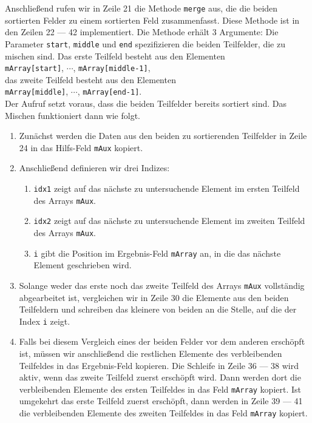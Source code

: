Anschlie{\ss}end rufen wir in Zeile 21 die Methode \texttt{merge} aus, die die beiden
sortierten Felder zu einem sortierten Feld zusammenfasst.  Diese Methode ist in den Zeilen
22 --- 42 implementiert.  Die Methode erh\"alt 3 Argumente: Die Parameter \texttt{start},
\texttt{middle} und \texttt{end} spezifizieren die beiden Teilfelder, die zu mischen sind.
Das erste Teilfeld besteht aus den Elementen \\[0.2cm]
\hspace*{1.3cm} \texttt{mArray[start]}, $\cdots$, \texttt{mArray[middle-1]}, \\[0.2cm]
das zweite Teilfeld besteht aus den Elementen \\[0.2cm]
\hspace*{1.3cm} \texttt{mArray[middle]}, $\cdots$, \texttt{mArray[end-1]}. \\[0.2cm]
Der Aufruf setzt voraus, dass die beiden Teilfelder bereits sortiert sind.
Das Mischen funktioniert dann wie folgt.
\begin{enumerate}
\item Zun\"achst werden die Daten aus den beiden zu sortierenden Teilfelder
      in Zeile 24 in das Hilfs-Feld \texttt{mAux} kopiert.
\item Anschlie{\ss}end definieren wir drei Indizes:
      \begin{enumerate}
      \item \texttt{idx1} zeigt auf das n\"achste zu untersuchende Element im ersten
            Teilfeld des Arrays \texttt{mAux}.
      \item \texttt{idx2} zeigt auf das n\"achste zu untersuchende Element im zweiten
            Teilfeld des Arrays \texttt{mAux}.
      \item \texttt{i} gibt die Position im Ergebnis-Feld \texttt{mArray} an, in die das
            n\"achste Element geschrieben wird.
      \end{enumerate}
\item Solange weder das erste noch das zweite Teilfeld des Arrays \texttt{mAux}
      vollst\"andig abgearbeitet ist, vergleichen wir in Zeile 30 die Elemente aus den beiden Teilfeldern
      und schreiben das kleinere von beiden an die Stelle, auf die der Index \texttt{i} zeigt.
\item Falls bei diesem Vergleich eines der beiden Felder vor dem anderen ersch\"opft ist,
      m\"ussen wir anschlie{\ss}end die restlichen Elemente des verbleibenden Teilfeldes
      in das Ergebnis-Feld kopieren.  Die Schleife in Zeile 36 --- 38 wird aktiv, wenn das
      zweite Teilfeld zuerst ersch\"opft wird.  Dann werden dort die verbleibenden Elemente
      des ersten Teilfeldes in das Feld \texttt{mArray} kopiert.  Ist umgekehrt das erste
      Teilfeld zuerst ersch\"opft, dann werden in Zeile 39 --- 41 die verbleibenden Elemente
      des zweiten Teilfeldes in das Feld \texttt{mArray} kopiert. 
\end{enumerate}

